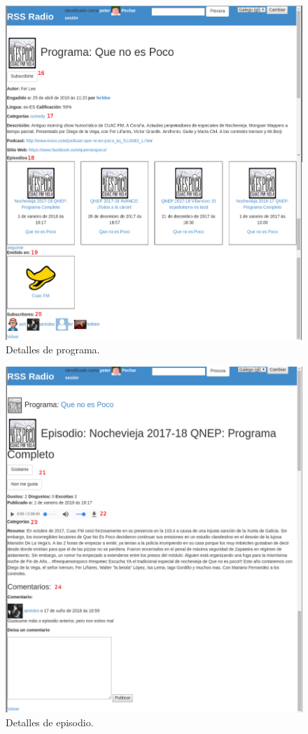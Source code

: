 \begin{figure}[H]
	\centering
	\includegraphics[scale=0.45,keepaspectratio=true]{./images/usermanual/um-programd1.png}
	\caption{Detalles de programa.}
	\label{fig:um-programd1}
\end{figure}


\begin{figure}[H]
	\centering
	\includegraphics[scale=0.45,keepaspectratio=true]{./images/usermanual/um-episoded1.png}
	\caption{Detalles de episodio.}
	\label{fig:um-episoded1}
\end{figure}

